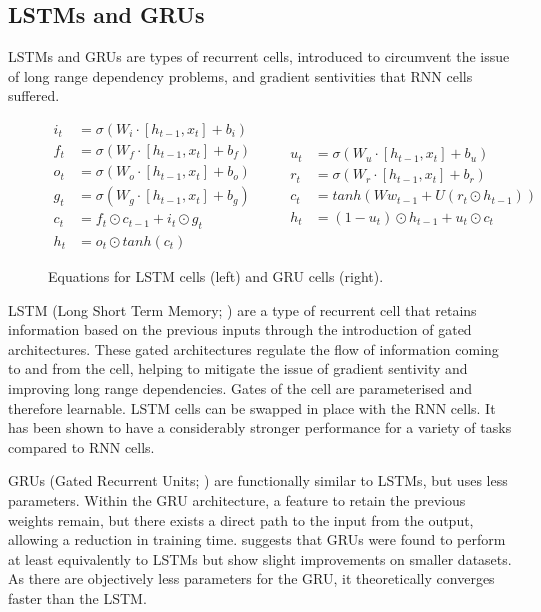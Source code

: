 \documentclass[12pt,twoside]{report}
\begin{document}
\subsection{LSTMs and GRUs} 

LSTMs and GRUs are types of recurrent cells, introduced to circumvent the issue of long range dependency problems, and gradient sentivities that RNN cells suffered.

\begin{figure}[!ht]
\begin{equation}
  \begin{split}
    i_t &= \sigma(W_i \cdot [h_{t-1},x_t] + b_i) \\
    f_t &= \sigma(W_f \cdot [h_{t-1},x_t] + b_f) \\
		o_t &= \sigma(W_o \cdot [h_{t-1},x_t] + b_o) \\
		g_t &= \sigma(W_g \cdot [h_{t-1},x_t] + b_g) \\
		c_t &= f_t \odot c_{t-1} + i_t \odot g_t \\
		h_t &= o_t \odot tanh(c_t) 
  \end{split}
	\quad\quad
  \begin{split}
		u_t &= \sigma(W_u \cdot [h_{t-1},x_t] + b_u) \\
		r_t &= \sigma(W_r \cdot [h_{t-1},x_t] + b_r) \\
		c_t &= tanh(Ww_{t-1}+U(r_t \odot h_{t-1})) \\
		h_t &= (1-u_{t})\odot h_{t-1} + u_t \odot c_t
  \end{split}
\end{equation}
\caption{Equations for LSTM cells (left) and GRU cells (right).}
\end{figure}
 
LSTM (Long Short Term Memory; \cite{hochreiter_long_1997}) are a type of recurrent cell that retains information based on the previous inputs through the introduction of gated architectures. These gated architectures regulate the flow of information coming to and from the cell, helping to mitigate the issue of gradient sentivity and improving long range dependencies. Gates of the cell are parameterised and therefore learnable. LSTM cells can be swapped in place with the RNN cells. It has been shown to have a considerably stronger performance for a variety of tasks compared to RNN cells.

GRUs (Gated Recurrent Units; \cite{cho_properties_2014}) are functionally similar to LSTMs, but uses less parameters. Within the GRU architecture, a feature to retain the previous weights remain, but there exists a direct path to the input from the output, allowing a reduction in training time. \cite{chung_empirical_2014} suggests that GRUs were found to perform at least equivalently to LSTMs but show slight improvements on smaller datasets. As there are objectively less parameters for the GRU, it theoretically converges faster than the LSTM.
\end{document}
